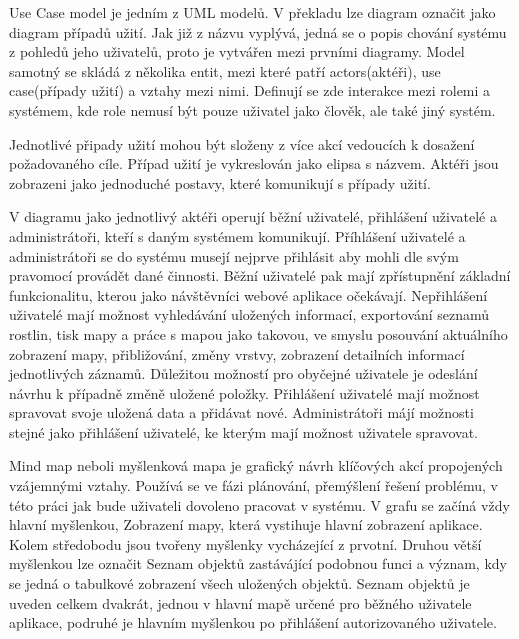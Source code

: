 \documentclass[12pt]{article}%
\begin{document}
{{
Use Case model je jedním z UML modelů. V překladu lze diagram označit jako diagram případů užití. 
Jak již z názvu vyplývá, jedná se o popis chování systému z pohledů jeho uživatelů, proto je 
vytvářen mezi prvními diagramy. Model samotný se skládá z několika entit, mezi které patří 
actors(aktéři),  use case(případy užití) a vztahy mezi nimi. Definují se zde interakce mezi rolemi 
a systémem, kde role nemusí být pouze uživatel jako člověk, ale také jiný systém.

Jednotlivé připady užití mohou být složeny z více akcí vedoucích k dosažení požadovaného cíle. 
Případ užití je vykreslován jako elipsa s názvem. Aktéři jsou zobrazeni jako jednoduché postavy, 
které komunikují s případy užití. 

V diagramu jako jednotlivý aktéři operují běžní uživatelé, přihlášení uživatelé a administrátoři, 
kteří s daným systémem komunikují. Příhlášení uživatelé a administrátoři se do systému musejí 
nejprve přihlásit aby mohli dle svým pravomocí provádět dané činnosti. Běžní uživatelé pak mají 
zpřístupnění základní funkcionalitu, kterou jako návštěvníci webové aplikace očekávají. Nepřihlášení 
uživatelé mají možnost vyhledávání uložených informací, exportování seznamů rostlin, tisk mapy 
a práce s mapou jako takovou, ve smyslu posouvání aktuálního zobrazení mapy, přibližování, změny 
vrstvy, zobrazení detailních informací jednotlivých záznamů. Důležitou možností pro obyčejné 
uživatele je odeslání návrhu k případně změně uložené položky. Přihlášení uživatelé mají možnost 
spravovat svoje uložená data a přidávat nové. Administrátoři májí možnosti stejné jako přihlášení 
uživatelé, ke kterým mají možnost uživatele spravovat. 

\newpage
\obrazek
{}
\newpage

Mind map neboli myšlenková mapa je grafický návrh klíčových akcí propojených vzájemnými vztahy. 
Používá se ve fázi plánování, přemýšlení řešení problému, v této práci jak bude uživateli dovoleno 
pracovat v systému. V grafu se začíná vždy hlavní myšlenkou, Zobrazení mapy, která vystihuje hlavní
zobrazení aplikace. Kolem středobodu jsou tvořeny myšlenky vycházející z prvotní. Druhou větší 
myšlenkou lze označit Seznam objektů zastávájící podobnou funci a význam, kdy se jedná o tabulkové 
zobrazení všech uložených objektů. Seznam objektů je uveden celkem dvakrát, jednou v hlavní mapě 
určené pro běžného uživatele aplikace, podruhé je hlavním myšlenkou po přihlášení autorizovaného 
uživatele.
\obrazek
{}

}}
\end{document}
